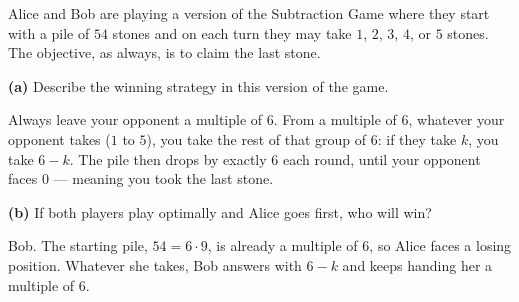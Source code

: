 \documentclass[12pt]{ximera}
\begin{document}
\begin{problem}
Alice and Bob are playing a version of the Subtraction Game where they start with a pile
of $54$ stones and on each turn they may take $1$, $2$, $3$, $4$, or $5$ stones. The
objective, as always, is to claim the last stone.

\begin{prompt}
\textbf{(a)} Describe the winning strategy in this version of the game.

\begin{freeResponse}
\end{freeResponse}

\begin{feedback}
Always leave your opponent a multiple of $6$. From a multiple of $6$, whatever your
opponent takes ($1$ to $5$), you take the rest of that group of $6$: if they take $k$,
you take $6-k$. The pile then drops by exactly $6$ each round, until your opponent faces
$0$ --- meaning you took the last stone.
\end{feedback}
\end{prompt}

\begin{prompt}
\textbf{(b)} If both players play optimally and Alice goes first, who will win?

\begin{multipleChoice}
\end{multipleChoice}

\begin{feedback}
Bob. The starting pile, $54=6\cdot 9$, is already a multiple of $6$, so Alice faces a
losing position. Whatever she takes, Bob answers with $6-k$ and keeps handing her a
multiple of $6$.
\end{feedback}
\end{prompt}
\end{problem}
\end{document}
